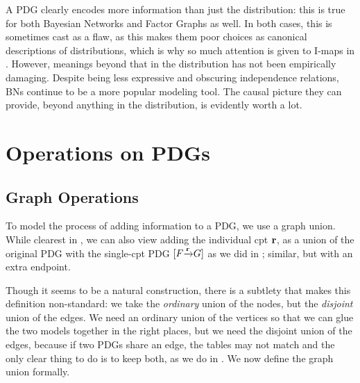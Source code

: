 \documentclass{article}
\newcommand\MaxEnt{_{\mathbf H}}
\newcommand{\bmu}{\boldsymbol{\mu}}
\newcommand{\Ed}{\mathcal E}
\newcommand{\MN}{PDG}
\numberwithin{equation}{section}
\begin{document}
	
	
	

	
	A PDG clearly encodes more information than just the distribution: this is true for both Bayesian Networks and Factor Graphs as well. In both cases, this is sometimes cast as a flaw, as this makes them poor choices as canonical descriptions of distributions, which is why so much attention is given to I-maps in \parencite{koller2009probabilistic}. However, meanings beyond that in the distribution has not been empirically damaging. Despite being less expressive and obscuring independence relations, BNs continue to be a more popular modeling tool. The causal picture they can provide, beyond anything in the distribution, is evidently worth a lot.

%

	
	\section{Operations on PDGs}\label{sec:pdg-operations}
	\subsection{Graph Operations}
	To model the process of adding information to a \MN, we use a graph union. While clearest in , we can also view adding the individual cpt $\mathbf r$, as a union of the original PDG with the single-cpt PDG $[F \smash{\xrightarrow{\mathbf r}} G]$ as we did in ;  similar, but with an extra endpoint.
	
	Though it seems to be a natural construction, there is a subtlety that makes this definition non-standard: we take the \emph{ordinary} union of the nodes, but the \emph{disjoint} union of the edges. We need an ordinary union of the vertices so that we can glue the two models together in the right places, but we need the disjoint union of the edges, because if two PDGs share an edge, the tables may not match and the only clear thing to do is to keep both, as we do in . 
	We now define the graph union formally. 
\end{document}
